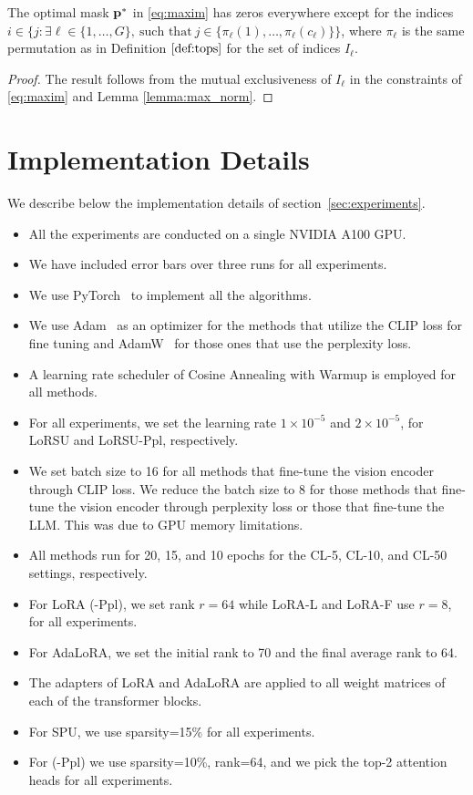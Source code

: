 \begin{corollary}
The optimal mask $\mathbf{p}^*$ in \eqref{eq:maxim} has zeros everywhere except for the indices $i \in \{j: \exists \ell \in \{1, \ldots, G \},~\text{such that}~j \in \{ \pi_{\ell}(1), \ldots,  \pi_{\ell}(c_{\ell})\}    \}$, where $\pi_{\ell}$ is the same permutation as in Definition $\ref{def:tops}$ for the set of indices $I_{\ell}
$.
\end{corollary}
\begin{proof}
    The result follows from the mutual exclusiveness of $I_{\ell}$ in the constraints of \eqref{eq:maxim} and Lemma \ref{lemma:max_norm}.
\end{proof}

\section{Implementation Details}\label{sec_appx:implementation_details}
We describe below the implementation details of section~\ref{sec:experiments}.
\begin{itemize}
    \item All the experiments are conducted on a single NVIDIA A100 GPU.
    \item We have included error bars over three runs for all experiments.
    \item We use PyTorch~\cite{paszke2019pytorch} to implement all the algorithms.
    \item We use Adam~\citep{kingma2014adam} as an optimizer for the methods that utilize the CLIP loss for fine tuning and AdamW~\citep{loshchilov2017decoupled} for those ones that use the perplexity loss. 
    \item A learning rate scheduler of Cosine Annealing with Warmup is employed for all methods.
    \item For all experiments, we set the learning rate $1 \times 10^{-5}$ and $2 \times 10^{-5}$, for LoRSU and LoRSU-Ppl, respectively.
    \item We set batch size to 16 for all methods that fine-tune the vision encoder through CLIP loss. We reduce the batch size to 8 for those methods that fine-tune the vision encoder through perplexity loss or those that fine-tune the LLM. This was due to GPU memory limitations.
    \item All methods run for 20, 15, and 10 epochs for the CL-5, CL-10, and CL-50 settings, respectively.
    \item For LoRA (-Ppl), we set rank $r=64$ while LoRA-L and LoRA-F use $r=8$, for all experiments.
    \item For AdaLoRA, we set the initial rank to 70 and the final average rank to 64.
    \item The adapters of LoRA and AdaLoRA are applied to all weight matrices of each of the transformer blocks.
    \item For SPU, we use sparsity=15\% for all experiments.
    \item For \ours (-Ppl) we use sparsity=10\%, rank=64, and we pick the top-2 attention heads for all experiments.   
\end{itemize}
